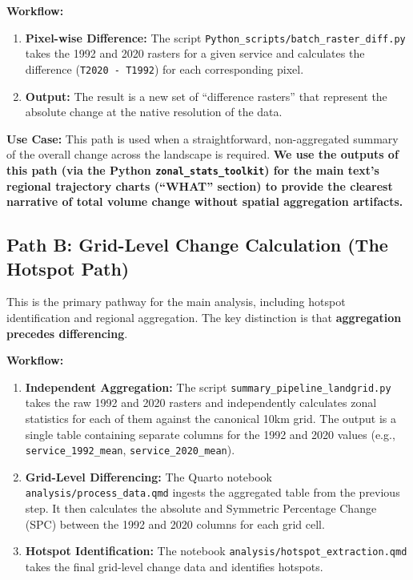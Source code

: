 \documentclass[
  letterpaper,
  DIV=11,
  numbers=noendperiod]{scrreprt}
\providecommand{\tightlist}{%
  \setlength{\itemsep}{0pt}\setlength{\parskip}{0pt}}
\begin{document}
\textbf{Workflow:}

\begin{enumerate}
\def\labelenumi{\arabic{enumi}.}
\tightlist
\item
  \textbf{Pixel-wise Difference:} The script
  \texttt{Python\_scripts/batch\_raster\_diff.py} takes the 1992 and
  2020 rasters for a given service and calculates the difference
  (\texttt{T2020\ -\ T1992}) for each corresponding pixel.
\item
  \textbf{Output:} The result is a new set of ``difference rasters''
  that represent the absolute change at the native resolution of the
  data.
\end{enumerate}

\textbf{Use Case:} This path is used when a straightforward,
non-aggregated summary of the overall change across the landscape is
required. \textbf{We use the outputs of this path (via the Python
\texttt{zonal\_stats\_toolkit}) for the main text's regional trajectory
charts (``WHAT'' section) to provide the clearest narrative of total
volume change without spatial aggregation artifacts.}

\subsection{Path B: Grid-Level Change Calculation (The Hotspot
Path)}\label{path-b-grid-level-change-calculation-the-hotspot-path}

This is the primary pathway for the main analysis, including hotspot
identification and regional aggregation. The key distinction is that
\textbf{aggregation precedes differencing}.

\textbf{Workflow:}

\begin{enumerate}
\def\labelenumi{\arabic{enumi}.}
\tightlist
\item
  \textbf{Independent Aggregation:} The script
  \texttt{summary\_pipeline\_landgrid.py} takes the raw 1992 and 2020
  rasters and independently calculates zonal statistics for each of them
  against the canonical 10km grid. The output is a single table
  containing separate columns for the 1992 and 2020 values (e.g.,
  \texttt{service\_1992\_mean}, \texttt{service\_2020\_mean}).
\item
  \textbf{Grid-Level Differencing:} The Quarto notebook
  \texttt{analysis/process\_data.qmd} ingests the aggregated table from
  the previous step. It then calculates the absolute and Symmetric
  Percentage Change (SPC) between the 1992 and 2020 columns for each
  grid cell.
\item
  \textbf{Hotspot Identification:} The notebook
  \texttt{analysis/hotspot\_extraction.qmd} takes the final grid-level
  change data and identifies hotspots.
\end{enumerate}
\end{document}
